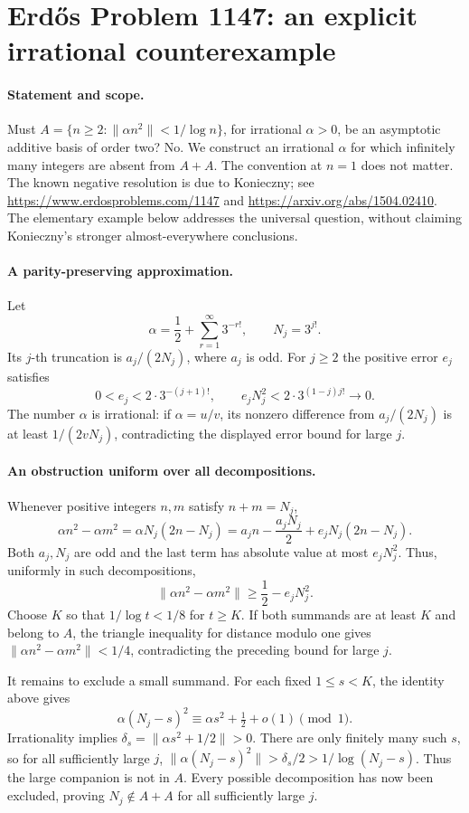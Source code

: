 \section*{Erd\H{o}s Problem 1147: an explicit irrational counterexample}

\paragraph{Statement and scope.}
Must \(A=\{n\geq2:\|\alpha n^2\|<1/\log n\}\), for irrational \(\alpha>0\), be an asymptotic additive basis of order two?
No. We construct an irrational \(\alpha\) for which infinitely many integers are absent from \(A+A\). The convention at \(n=1\) does not matter. The known negative resolution is due to Konieczny; see \url{https://www.erdosproblems.com/1147} and \url{https://arxiv.org/abs/1504.02410}. The elementary example below addresses the universal question, without claiming Konieczny's stronger almost-everywhere conclusions.

\paragraph{A parity-preserving approximation.}
Let
\[
 \alpha=\frac12+\sum_{r=1}^{\infty}3^{-r!},
 \qquad N_j=3^{j!}.
\]
Its \(j\)-th truncation is \(a_j/(2N_j)\), where \(a_j\) is odd. For \(j\geq2\) the positive error \(e_j\) satisfies
\[
 0<e_j<2\cdot3^{-(j+1)!},\qquad
 e_jN_j^2<2\cdot3^{(1-j)j!}\longrightarrow0.
\]
The number \(\alpha\) is irrational: if \(\alpha=u/v\), its nonzero difference from \(a_j/(2N_j)\) is at least \(1/(2vN_j)\), contradicting the displayed error bound for large \(j\).

\paragraph{An obstruction uniform over all decompositions.}
Whenever positive integers \(n,m\) satisfy \(n+m=N_j\),
\[
 \alpha n^2-\alpha m^2
 =\alpha N_j(2n-N_j)
 =a_j n-\frac{a_jN_j}{2}+e_jN_j(2n-N_j).
\]
Both \(a_j,N_j\) are odd and the last term has absolute value at most \(e_jN_j^2\). Thus, uniformly in such decompositions,
\[
 \|\alpha n^2-\alpha m^2\|\geq\frac12-e_jN_j^2.
\]
Choose \(K\) so that \(1/\log t<1/8\) for \(t\geq K\).
If both summands are at least \(K\) and belong to \(A\), the triangle inequality for distance modulo one gives
\(\|\alpha n^2-\alpha m^2\|<1/4\), contradicting the preceding bound for large \(j\).

It remains to exclude a small summand. For each fixed \(1\leq s<K\), the identity above gives
\[
 \alpha(N_j-s)^2\equiv \alpha s^2+\tfrac12+o(1)\pmod1.
\]
Irrationality implies \(\delta_s=\|\alpha s^2+1/2\|>0\).
There are only finitely many such \(s\), so for all sufficiently large \(j\),
\(\|\alpha(N_j-s)^2\|>\delta_s/2>1/\log(N_j-s)\).
Thus the large companion is not in \(A\).
Every possible decomposition has now been excluded, proving \(N_j\notin A+A\) for all sufficiently large \(j\).

